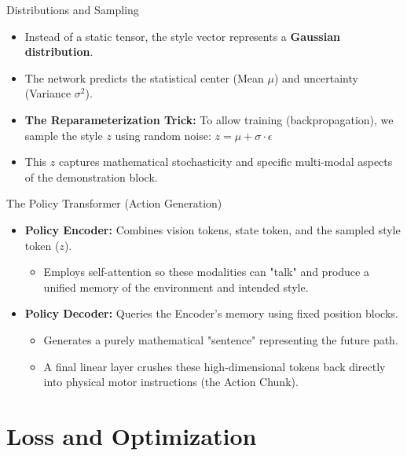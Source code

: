 \documentclass[11pt, aspectratio=169]{beamer}
\begin{document}
\begin{frame}{Distributions and Sampling}
    \begin{itemize}
        \item Instead of a static tensor, the style vector represents a \textbf{Gaussian distribution}.
        \item The network predicts the statistical center (Mean $\mu$) and uncertainty (Variance $\sigma^2$).
        \item \textbf{The Reparameterization Trick:} To allow training (backpropagation), we sample the style $z$ using random noise: $z = \mu + \sigma \cdot \epsilon$
        \item This $z$ captures mathematical stochasticity and specific multi-modal aspects of the demonstration block.
    \end{itemize}
\end{frame}

\begin{frame}{The Policy Transformer (Action Generation)}
    \begin{itemize}
        \item \textbf{Policy Encoder:} Combines vision tokens, state token, and the sampled style token ($z$).
        \begin{itemize}
            \item Employs self-attention so these modalities can "talk" and produce a unified memory of the environment and intended style.
        \end{itemize}
        \item \textbf{Policy Decoder:} Queries the Encoder's memory using fixed position blocks.
        \begin{itemize}
            \item Generates a purely mathematical "sentence" representing the future path.
            \item A final linear layer crushes these high-dimensional tokens back directly into physical motor instructions (the Action Chunk).
        \end{itemize}
    \end{itemize}
\end{frame}

\section{Loss and Optimization}
\end{document}
